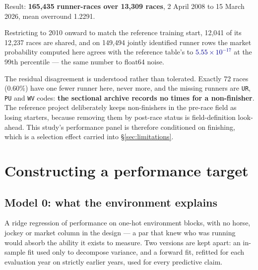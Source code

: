 \documentclass[11pt,a4paper]{article}
\newcommand{\good}[1]{\textcolor{darkblue}{\textbf{#1}}}
\begin{document}
Result: \textbf{165{,}435 runner-races over 13{,}309 races}, 2 April 2008 to
15 March 2026, mean overround 1.2291.

Restricting to 2010 onward to match the reference training start, 12{,}041 of its
12{,}237 races are shared, and on 149{,}494 jointly identified runner rows the
market probability computed here agrees with the reference table's to
\good{$5.55\times10^{-17}$} at the 99th percentile --- the same number to float64
noise.

The residual disagreement is understood rather than tolerated. Exactly 72 races
(0.60\%) have one fewer runner here, never more, and the missing runners are
\texttt{UR}, \texttt{PU} and \texttt{WV} codes: \textbf{the sectional archive
records no times for a non-finisher}. The reference project deliberately keeps
non-finishers in the pre-race field as losing starters, because removing them by
post-race status is field-definition look-ahead. This study's performance panel is
therefore conditioned on finishing, which is a selection effect carried into
\S\ref{sec:limitations}.

\newpage
\section{Constructing a performance target}

\subsection{Model 0: what the environment explains}

A ridge regression of performance on one-hot environment blocks, with no horse,
jockey or market column in the design --- a par that knew who was running would
absorb the ability it exists to measure. Two versions are kept apart: an in-sample
fit used only to decompose variance, and a forward fit, refitted for each
evaluation year on strictly earlier years, used for every predictive claim.
\end{document}
